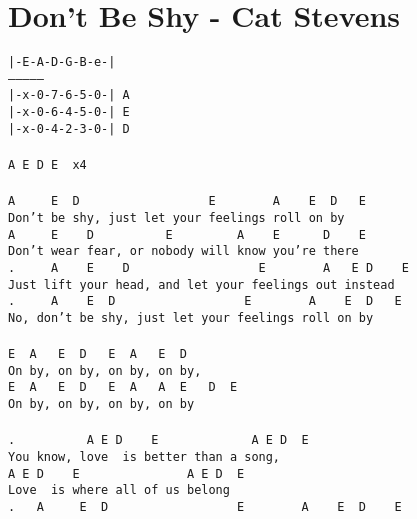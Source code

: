 \newpage
\section{Don't Be Shy - Cat Stevens}
\label{Don't Be Shy - Cat Stevens}
\texttt{|-E-A-D-G-B-e-|\\
---------------\\
|-x-0-7-6-5-0-|\ A\\
|-x-0-6-4-5-0-|\ E\\
|-x-0-4-2-3-0-|\ D\\
\\
A\ E\ D\ E\ \ x4\\
\\
A\ \ \ \ \ E\ \ D\ \ \ \ \ \ \ \ \ \ \ \ \ \ \ \ \ \ E\ \ \ \ \ \ \ \ A\ \ \ \ E\ \ D\ \ \ E\\
Don't\ be\ shy,\ just\ let\ your\ feelings\ roll\ on\ by\\
A\ \ \ \ \ E\ \ \ \ D\ \ \ \ \ \ \ \ \ \ E\ \ \ \ \ \ \ \ \ A\ \ \ \ E\ \ \ \ \ \ D\ \ \ \ E\\
Don't\ wear\ fear,\ or\ nobody\ will\ know\ you're\ there\\
.\ \ \ \ \ A\ \ \ \ E\ \ \ \ D\ \ \ \ \ \ \ \ \ \ \ \ \ \ \ \ \ \ E\ \ \ \ \ \ \ \ A\ \ \ E\ D\ \ \ \ E\\
Just\ lift\ your\ head,\ and\ let\ your\ feelings\ out\ instead\\
.\ \ \ \ \ A\ \ \ \ E\ \ D\ \ \ \ \ \ \ \ \ \ \ \ \ \ \ \ \ \ E\ \ \ \ \ \ \ \ A\ \ \ \ E\ \ D\ \ \ E\\
No,\ don't\ be\ shy,\ just\ let\ your\ feelings\ roll\ on\ by\\
\\
E\ \ A\ \ \ E\ \ D\ \ \ E\ \ A\ \ \ E\ \ D\\
On\ by,\ on\ by,\ on\ by,\ on\ by,\ \\
E\ \ A\ \ \ E\ \ D\ \ \ E\ \ A\ \ \ A\ \ E\ \ \ D\ \ E\\
On\ by,\ on\ by,\ on\ by,\ on\ by\\
\\
.\ \ \ \ \ \ \ \ \ \ A\ E\ D\ \ \ \ E\ \ \ \ \ \ \ \ \ \ \ \ \ A\ E\ D\ \ E\\
You\ know,\ love\ \ is\ better\ than\ a\ song,\\
A\ E\ D\ \ \ \ E\ \ \ \ \ \ \ \ \ \ \ \ \ \ \ A\ E\ D\ \ E\ \\
Love\ \ is\ where\ all\ of\ us\ belong\\
.\ \ \ A\ \ \ \ \ E\ \ D\ \ \ \ \ \ \ \ \ \ \ \ \ \ \ \ \ \ E\ \ \ \ \ \ \ \ A\ \ \ \ E\ \ D\ \ \ \ E\\
}
